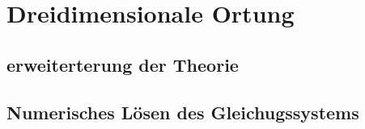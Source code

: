   \section{Dreidimensionale Ortung} 
      \subsection{erweiterterung der Theorie}
      \subsection{Numerisches Lösen des Gleichugssystems}
